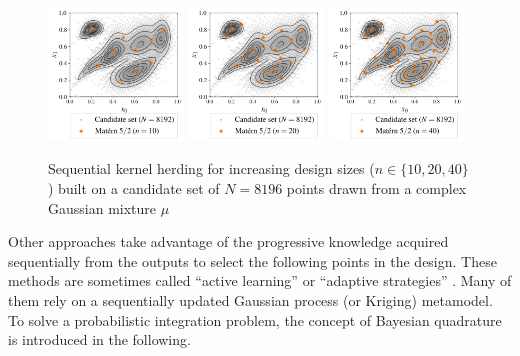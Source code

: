 \begin{figure}[!h]
\begin{center}
    \includegraphics[width=0.32\textwidth]{part2/figures/DCE/numerical_experiments/gaussian_mixture_sampling10.jpg}
    \includegraphics[width=0.32\textwidth]{part2/figures/DCE/numerical_experiments/gaussian_mixture_sampling20.jpg}
    \includegraphics[width=0.32\textwidth]{part2/figures/DCE/numerical_experiments/gaussian_mixture_sampling40.jpg}
\end{center}
\caption{Sequential kernel herding for increasing design sizes ($n\in\{10, 20, 40\}$) built on a candidate set of $N=8196$ points drawn from a complex Gaussian mixture $\mu$} \label{fig:KH_mixture}
\end{figure}

Other approaches take advantage of the progressive knowledge acquired sequentially from the outputs to select the following points in the design. 
These methods are sometimes called ``active learning'' or ``adaptive strategies'' \citep{fau_2021}. 
Many of them rely on a sequentially updated Gaussian process (or Kriging) metamodel. 
To solve a probabilistic integration problem, the concept of Bayesian quadrature is introduced in the following. 

